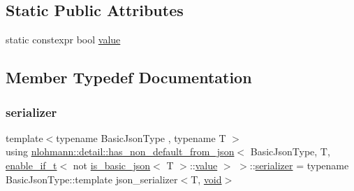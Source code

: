 \subsection*{Static Public Attributes}
\begin{DoxyCompactItemize}
\item 
static constexpr bool \hyperlink{structnlohmann_1_1detail_1_1has__non__default__from__json_3_01_basic_json_type_00_01_t_00_01enab81bd4c814ac1146ff15f3f4636933207_a1494ac5fed1163aab4a89208ff04ee85}{value}
\end{DoxyCompactItemize}


\subsection{Member Typedef Documentation}
\mbox{\label{structnlohmann_1_1detail_1_1has__non__default__from__json_3_01_basic_json_type_00_01_t_00_01enab81bd4c814ac1146ff15f3f4636933207_a610272ed924122e0c46d158ecdfe6faf}} 
\subsubsection{\texorpdfstring{serializer}{serializer}}
{\footnotesize\ttfamily template$<$typename Basic\+Json\+Type , typename T $>$ \\
using \hyperlink{structnlohmann_1_1detail_1_1has__non__default__from__json}{nlohmann\+::detail\+::has\+\_\+non\+\_\+default\+\_\+from\+\_\+json}$<$ Basic\+Json\+Type, T, \hyperlink{namespacenlohmann_1_1detail_a02bcbc878bee413f25b985ada771aa9c}{enable\+\_\+if\+\_\+t}$<$ not \hyperlink{structnlohmann_1_1detail_1_1is__basic__json}{is\+\_\+basic\+\_\+json}$<$ T $>$\+::\hyperlink{structnlohmann_1_1detail_1_1has__non__default__from__json_3_01_basic_json_type_00_01_t_00_01enab81bd4c814ac1146ff15f3f4636933207_a1494ac5fed1163aab4a89208ff04ee85}{value} $>$ $>$\+::\hyperlink{structnlohmann_1_1detail_1_1has__non__default__from__json_3_01_basic_json_type_00_01_t_00_01enab81bd4c814ac1146ff15f3f4636933207_a610272ed924122e0c46d158ecdfe6faf}{serializer} =  typename Basic\+Json\+Type\+::template json\+\_\+serializer$<$T, \hyperlink{namespacenlohmann_1_1detail_a59fca69799f6b9e366710cb9043aa77d}{void}$>$}



